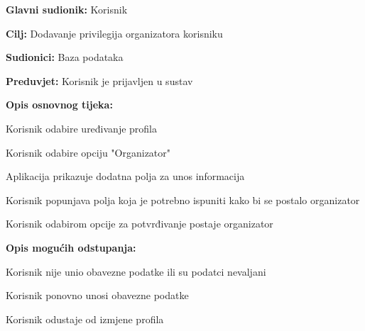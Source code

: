     	\noindent {}
    	\begin{packed_item}
    		
    		\item \textbf{Glavni sudionik: }Korisnik
    		\item  \textbf{Cilj:} Dodavanje privilegija organizatora korisniku
    		\item  \textbf{Sudionici:} Baza podataka
    		\item  \textbf{Preduvjet:} Korisnik je prijavljen u sustav
    		\item  \textbf{Opis osnovnog tijeka:}
    		
    		\item[] \begin{packed_enum}
    			
    			\item Korisnik odabire uređivanje profila
    			\item Korisnik odabire opciju "Organizator"
    			\item Aplikacija prikazuje dodatna polja za unos informacija
    			\item Korisnik popunjava polja koja je potrebno ispuniti kako bi se postalo organizator
    			\item Korisnik odabirom opcije za potvrđivanje postaje organizator
    			
    		\end{packed_enum}
    		
    		\item  \textbf{Opis mogućih odstupanja:}
    		
    		\item[] \begin{packed_item}
    			
    			\item[4.a] Korisnik nije unio obavezne podatke ili su podatci nevaljani
    			\item[] \begin{packed_enum}
    				
    				\item Korisnik ponovno unosi obavezne podatke
    				\item Korisnik odustaje od izmjene profila
    				
    			\end{packed_enum}
    			
    		\end{packed_item}
    	\end{packed_item}
    
